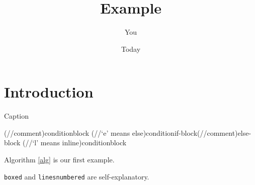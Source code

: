 \documentclass{article}
\title{Example}
\author{You}
\date{Today}
\begin{document}
\maketitle

\section{Introduction}
\begin{algorithm}
\caption{Caption}\label{alg}
\For(//comment){condition}{block}
\eIf(//`e' means else){condition}{if-block}(//comment){else-block}
\lIf(//`l' means inline){condition}{block}
\end{algorithm}

Algorithm \ref{alg} is our first example.


\verb+boxed+ and \verb+linesnumbered+ are self-explanatory.
\end{document}

